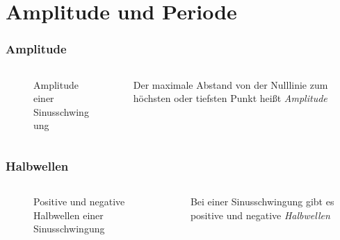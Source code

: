
\section{Amplitude und Periode}
\label{section:amplitude_periode}
\begin{frame}%

\frametitle{Amplitude}
\begin{columns}
    \begin{column}{0.48\textwidth}
    
\begin{figure}
    \caption{\scriptsize  Amplitude einer Sinusschwingung}
    \label{amplitude_periode_amplitudee}
\end{figure}


    \end{column}
   \begin{column}{0.48\textwidth}
       Der maximale Abstand von der Nulllinie zum höchsten oder tiefsten Punkt heißt \emph{Amplitude}


   \end{column}
\end{columns}

\end{frame}

\begin{frame}
\end{frame}

\begin{frame}
\frametitle{Halbwellen}
\begin{columns}
    \begin{column}{0.48\textwidth}
    
\begin{figure}
    \caption{\scriptsize Positive und negative Halbwellen einer Sinusschwingung}
    \label{amplitude_periode_halbwellen}
\end{figure}


    \end{column}
   \begin{column}{0.48\textwidth}
       Bei einer Sinusschwingung gibt es positive und negative \emph{Halbwellen}


   \end{column}
\end{columns}

\end{frame}

